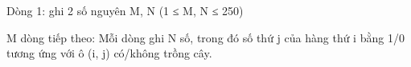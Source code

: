 Dòng 1: ghi 2 số nguyên M, N (1 ≤ M, N ≤ 250)  

   M dòng tiếp theo: Mỗi dòng ghi N số, trong đó số thứ j của hàng thứ i bằng 1/0 tương ứng với ô (i, j) có/không trồng cây.  

\